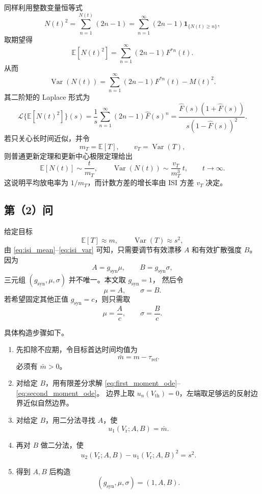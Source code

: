 \documentclass[UTF8]{ctexart}
\begin{document}
同样利用整数变量恒等式
\[
N(t)^2=\sum_{n=1}^{N(t)}(2n-1)
=\sum_{n=1}^{\infty}(2n-1)\mathbf 1_{\{N(t)\ge n\}},
\]
取期望得
\begin{equation}
	\mathbb E[N(t)^2]
	=\sum_{n=1}^{\infty}(2n-1)F^{*n}(t).
	\label{eq:renewal_second_exact}
\end{equation}
从而
\begin{equation}
	\operatorname{Var}(N(t))
	=\sum_{n=1}^{\infty}(2n-1)F^{*n}(t)-M(t)^2.
	\label{eq:renewal_var_exact}
\end{equation}
其二阶矩的 Laplace 形式为
\begin{equation}
	\mathcal L\{\mathbb E[N(t)^2]\}(s)
	=\frac{1}{s}\sum_{n=1}^{\infty}(2n-1)\widehat F(s)^n
	=\frac{\widehat F(s)(1+\widehat F(s))}
	{s(1-\widehat F(s))^2}.
	\label{eq:renewal_second_laplace}
\end{equation}
若只关心长时间近似，并令
\[
m_T=\mathbb E[T],\qquad v_T=\operatorname{Var}(T),
\]
则普通更新定理和更新中心极限定理给出
\begin{equation}
	\mathbb E[N(t)]\sim \frac{t}{m_T},
	\qquad
	\operatorname{Var}(N(t))\sim \frac{v_T}{m_T^3}\,t,
	\qquad t\to\infty.
	\label{eq:renewal_asymptotic}
\end{equation}
这说明平均放电率为 $1/m_T$，而计数方差的增长率由 ISI 方差 $v_T$ 决定。

\subsection{第（2）问}

给定目标
\[
\mathbb E[T]\approx m,\qquad \operatorname{Var}(T)\approx s^2,
\]
由 \eqref{eq:isi_mean}--\eqref{eq:isi_var} 可知，只需要调节有效漂移 $A$ 和有效扩散强度
$B$。因为
\[
A=g_{\mathrm{syn}}\mu,\qquad B=g_{\mathrm{syn}}\sigma,
\]
三元组 $(g_{\mathrm{syn}},\mu,\sigma)$ 并不唯一。本文取 $g_{\mathrm{syn}}=1$，
然后令
\[
\mu=A,\qquad \sigma=B.
\]
若希望固定其他正值 $g_{\mathrm{syn}}=c$，则只需取
\[
\mu=\frac{A}{c},\qquad \sigma=\frac{B}{c}.
\]

具体构造步骤如下。

\begin{enumerate}
	\item 先扣除不应期，令目标首达时间均值为
	\[
	\bar m=m-\tau_{\mathrm{ref}}.
	\]
	必须有 $\bar m>0$。
	\item 对给定 $B$，用有限差分求解 \eqref{eq:first_moment_ode}--\eqref{eq:second_moment_ode}。
	边界上取 $u_n(V_{\mathrm{th}})=0$，左端取足够远的反射边界近似自然边界。
	\item 对给定 $B$，用二分法寻找 $A$，使
	\[
	u_1(V_{\mathrm r};A,B)=\bar m.
	\]
	\item 再对 $B$ 做二分法，使
	\[
	u_2(V_{\mathrm r};A,B)-u_1(V_{\mathrm r};A,B)^2=s^2.
	\]
	\item 得到 $A,B$ 后构造
	\[
	(g_{\mathrm{syn}},\mu,\sigma)=\left(1,A,B\right).
	\]
\end{enumerate}
\end{document}
